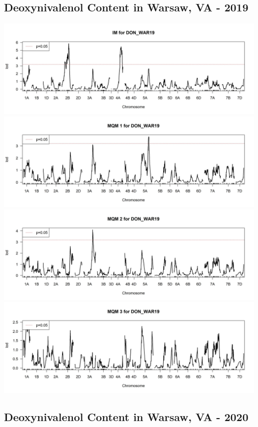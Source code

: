 \documentclass[
]{article}
\begin{document}
\subsection{Deoxynivalenol Content in Warsaw, VA -
2019}\label{deoxynivalenol-content-in-warsaw-va---2019}

\includegraphics{Scan_IM_DON_WAR19.jpg}
\includegraphics{Scan_MQM1_DON_WAR19.jpg}
\includegraphics{Scan_MQM2_DON_WAR19.jpg}
\includegraphics{Scan_MQM3_DON_WAR19.jpg} \pagebreak

\subsection{Deoxynivalenol Content in Warsaw, VA -
2020}\label{deoxynivalenol-content-in-warsaw-va---2020}
\end{document}
